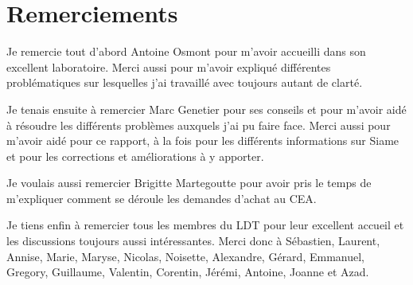 \chapter*{Remerciements}

Je remercie tout d'abord Antoine Osmont pour m'avoir accueilli dans son excellent laboratoire. Merci aussi pour m'avoir expliqué différentes problématiques sur lesquelles j'ai travaillé avec toujours autant de clarté.

Je tenais ensuite à remercier Marc Genetier pour ses conseils et pour m'avoir aidé à résoudre les différents problèmes auxquels j'ai pu faire face. Merci aussi pour m'avoir aidé pour ce rapport, à la fois pour les différents informations sur Siame et pour les corrections et améliorations à y apporter. 

Je voulais aussi remercier Brigitte Martegoutte pour avoir pris le temps de m'expliquer comment se déroule les demandes d'achat au CEA. 

Je tiens enfin à remercier tous les membres du LDT pour leur excellent accueil et les discussions toujours aussi intéressantes. Merci donc à Sébastien, Laurent, Annise, Marie, Maryse, Nicolas, Noisette, Alexandre, Gérard, Emmanuel, Gregory, Guillaume, Valentin, Corentin, Jérémi, Antoine, Joanne et Azad.
